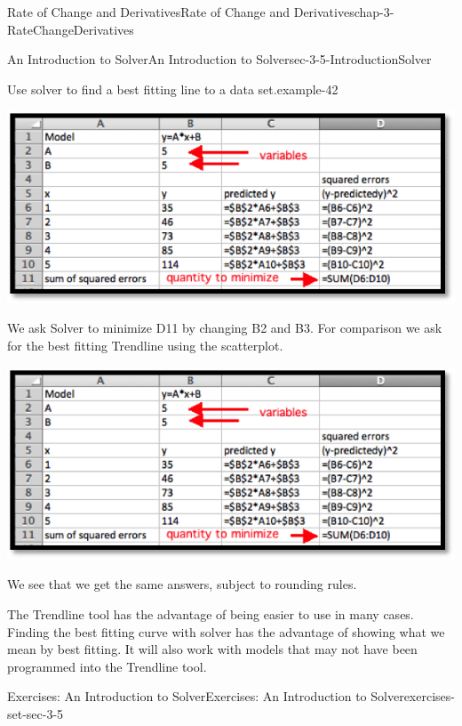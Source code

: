 \documentclass[oneside,10pt,]{book}
\numberwithin{equation}{section}
\begin{document}
\begin{chapterptx}{Rate of Change and Derivatives}{}{Rate of Change and Derivatives}{}{}{chap-3-RateChangeDerivatives}
\begin{sectionptx}{An Introduction to Solver}{}{An Introduction to Solver}{}{}{sec-3-5-IntroductionSolver}
\begin{example}{Use solver to find a best fitting line to a data set.}{example-42}
\begin{sidebyside}{1}{0.15}{0.15}{0}
\begin{sbspanel}{0.7}
\includegraphics[width=1\linewidth]{images/sec3-5-15.png}
\end{sbspanel}%
\end{sidebyside}%
\par
\hypertarget{p-1359}{}%
We ask Solver to minimize D11 by changing B2 and B3.  For comparison we ask for the best fitting Trendline using the scatterplot.%
\begin{sidebyside}{1}{0.1}{0.1}{0}%
\begin{sbspanel}{0.8}%
\includegraphics[width=1\linewidth]{images/sec3-5-15.png}
\end{sbspanel}%
\end{sidebyside}%
\par
\hypertarget{p-1360}{}%
We see that we get the same answers, subject to rounding rules.%
\end{example}
\hypertarget{p-1361}{}%
The Trendline tool has the advantage of being easier to use in many cases.  Finding the best fitting curve with solver has the advantage of showing what we mean by best fitting.  It will also work with models that may not have been programmed into the Trendline tool.%
%
%
\typeout{************************************************}
\typeout{************************************************}
%
\begin{exercises-subsection-numberless}{Exercises: An Introduction to Solver}{}{Exercises: An Introduction to Solver}{}{}{exercises-set-sec-3-5}

\end{exercises-subsection-numberless}
\end{sectionptx}
\end{chapterptx}
\end{document}
